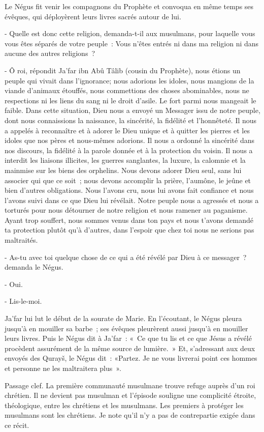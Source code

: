 {Le Négus fit venir les compagnons du Prophète et convoqua en même
temps ses évêques, qui déployèrent leurs livres sacrés autour de lui.}

{- Quelle est donc cette religion, demanda-t-il aux musulmans, pour
laquelle vous vous êtes séparés de votre peuple~: Vous n'êtes entrés ni
dans ma religion ni dans aucune des autres religions~?}

{- Ô roi, répondit Ja'far ibn Abû Tâlib (cousin du Prophète), nous
étions un peuple qui vivait dans l'ignorance; nous adorions les idoles,
nous mangions de la viande d'animaux étouffés, nous commettions des
choses abominables, nous ne respections ni les liens du sang ni le droit
d'asile. Le fort parmi nous mangeait le faible. Dans cette situation,
Dieu nous a envoyé un Messager issu de notre peuple, dont nous
connaissions la naissance, la sincérité, la fidélité et l'honnêteté. Il
nous a appelés à reconnaître et à adorer le Dieu unique et à quitter les
pierres et les idoles que nos pères et nous-mêmes adorions. Il nous a
ordonné la sincérité dans nos discours, la fidélité à la parole donnée
et à la protection du voisin. Il nous a interdit les liaisons illicites,
les guerres sanglantes, la luxure, la calomnie et la mainmise sur les
biens des orphelins. Nous devons adorer Dieu seul, sans lui associer qui
que ce soit~; nous devons accomplir la prière, l'aumône, le jeûne et
bien d'autres obligations. Nous l'avons cru, nous lui avons fait
confiance et nous l'avons suivi dans ce que Dieu lui révélait. Notre
peuple nous a agressés et nous a torturés pour nous détourner de notre
religion et nous ramener au paganisme. Ayant trop souffert, nous sommes
venus dans ton pays et nous t'avons demandé ta protection plutôt qu'à
d'autres, dans l'espoir que chez toi nous ne serions pas maltraités.}

{- As-tu avec toi quelque chose de ce qui a été révélé par Dieu à
ce messager~? demanda le Négus.}

{- Oui.}

{- Lis-le-moi.}

{Ja'far lui lut le début de la sourate de Marie. En l'écoutant, le
Négus pleura jusqu'à en mouiller sa barbe~; ses évêques pleurèrent aussi
jusqu'à en mouiller leurs livres. Puis le Négus dit à Ja'far~: «~Ce que
tu lis et ce que Jésus a révélé procèdent assurément de la même source
de lumière.~» Et, s'adressant aux deux envoyés des Qurayš, le Négus
dit~: «Partez. Je ne vous livrerai point ces hommes et personne ne les
maltraitera plus~».}

Passage clef. La première communauté musulmane trouve refuge auprès d'un
roi chrétien. Il ne devient pas musulman et l'épisode souligne une
complicité étroite, théologique, entre les chrétiens et les musulmans.
Les premiers à protéger les musulmans sont les chrétiens. Je note qu'il
n'y a pas de contrepartie exigée dans ce récit.


